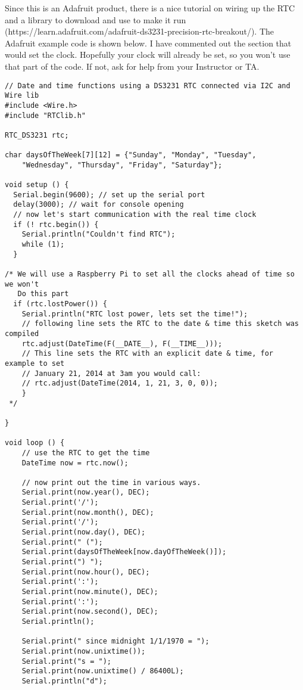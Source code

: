 Since this is an Adafruit product, there is a nice tutorial on wiring up the
RTC and a library to download and use to make it run
(https://learn.adafruit.com/adafruit-ds3231-precision-rtc-breakout/). The
Adafruit example code is shown below. I have commented out the section that
would set the clock. Hopefully your clock will already be set, so you won't
use that part of the code. If not, ask for help from your Instructor or TA.

\bigskip
\begin{verbatim}
// Date and time functions using a DS3231 RTC connected via I2C and Wire lib
#include <Wire.h>
#include "RTClib.h"
 
RTC_DS3231 rtc;
 
char daysOfTheWeek[7][12] = {"Sunday", "Monday", "Tuesday", 
    "Wednesday", "Thursday", "Friday", "Saturday"};
 
void setup () {
  Serial.begin(9600); // set up the serial port
  delay(3000); // wait for console opening
  // now let's start communication with the real time clock
  if (! rtc.begin()) {
    Serial.println("Couldn't find RTC");
    while (1);
  }
 
/* We will use a Raspberry Pi to set all the clocks ahead of time so we won't
   Do this part
  if (rtc.lostPower()) {
    Serial.println("RTC lost power, lets set the time!");
    // following line sets the RTC to the date & time this sketch was compiled
    rtc.adjust(DateTime(F(__DATE__), F(__TIME__)));
    // This line sets the RTC with an explicit date & time, for example to set
    // January 21, 2014 at 3am you would call:
    // rtc.adjust(DateTime(2014, 1, 21, 3, 0, 0));
    }
 */ 
  
}
 
void loop () {
    // use the RTC to get the time
    DateTime now = rtc.now();
    
    // now print out the time in various ways.
    Serial.print(now.year(), DEC);
    Serial.print('/');
    Serial.print(now.month(), DEC);
    Serial.print('/');
    Serial.print(now.day(), DEC);
    Serial.print(" (");
    Serial.print(daysOfTheWeek[now.dayOfTheWeek()]);
    Serial.print(") ");
    Serial.print(now.hour(), DEC);
    Serial.print(':');
    Serial.print(now.minute(), DEC);
    Serial.print(':');
    Serial.print(now.second(), DEC);
    Serial.println();
    
    Serial.print(" since midnight 1/1/1970 = ");
    Serial.print(now.unixtime());
    Serial.print("s = ");
    Serial.print(now.unixtime() / 86400L);
    Serial.println("d");
    

\end{verbatim}
